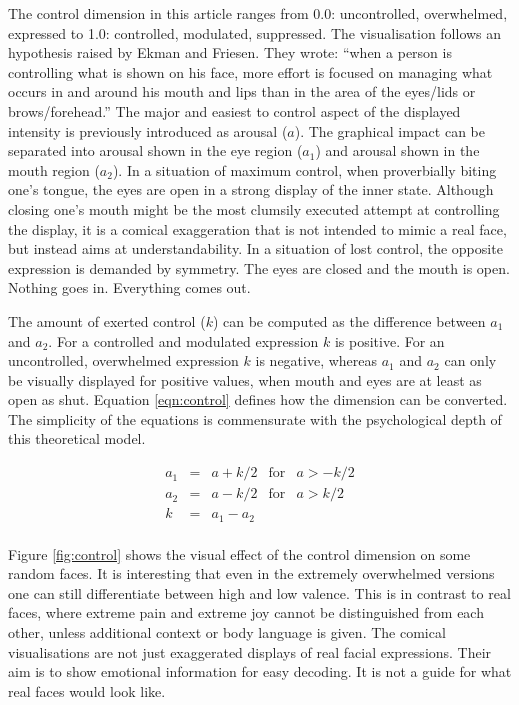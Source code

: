 The control dimension in this article ranges from 0.0: uncontrolled, overwhelmed, expressed to
1.0: controlled, modulated, suppressed. The visualisation follows an hypothesis raised by Ekman and Friesen\cite{Ekman75}.
They wrote: ``when a person is controlling what is shown on his face, more effort is focused on managing what occurs
in and around his mouth and lips than in the area of the eyes/lids or brows/forehead.''
The major and easiest to control aspect of the displayed intensity is previously introduced as arousal ($a$).
The graphical impact can be separated into arousal shown in the eye region ($a_1$) and arousal
shown in the mouth region ($a_2$).
In a situation of maximum control, when proverbially biting one's tongue, the eyes are open in a strong display
of the inner state. Although closing one's mouth might be the most clumsily executed attempt at controlling
the display, it is a comical exaggeration that is not intended to mimic a real face, but instead aims
at understandability. In a situation of lost control, the opposite expression is demanded by symmetry.
The eyes are closed and the mouth is open. Nothing goes in. Everything comes out.

The amount of exerted control ($k$) can be computed as the difference between $a_1$ and $a_2$. For a controlled and
modulated expression $k$ is positive. For an uncontrolled, overwhelmed expression $k$ is negative, whereas $a_1$ and
$a_2$ can only be visually displayed for positive values, when mouth and eyes are at least as open as shut.
Equation \eqref{eqn:control} defines how the dimension can be converted.
The simplicity of the equations is commensurate with the psychological depth of this theoretical model.

\begin{equation}
  \label{eqn:control}
  \begin{array}{rclll}
      a_1 &=& a + k/2 &\mbox{for}& a > -k/2 \\
      a_2 &=& a - k/2 &\mbox{for}& a > k/2\\
      k &=& a_1 - a_2 \\
  \end{array}
\end{equation}

Figure \ref{fig:control} shows the visual effect of the control dimension on some random faces.
It is interesting that even in the extremely overwhelmed versions one can still differentiate between high and low valence.
This is in contrast to real faces, where extreme pain and extreme joy cannot be distinguished from each other, unless
additional context or body language is given\cite{painjoy}.
The comical visualisations are not just exaggerated displays of real facial expressions. Their aim
is to show emotional information for easy decoding. It is not a guide for what real faces would look like.

